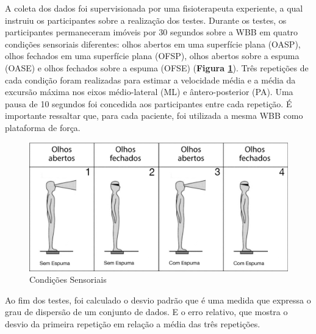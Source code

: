 A coleta dos dados foi supervisionada por uma fisioterapeuta experiente, a qual instruiu os participantes sobre a realização dos testes. Durante os testes, os participantes permaneceram imóveis por 30 segundos sobre a WBB em quatro condições sensoriais diferentes: olhos abertos em uma superfície plana (OASP), olhos fechados em uma superfície plana (OFSP), olhos abertos sobre a espuma (OASE) e olhos fechados sobre a espuma (OFSE) (\textbf{Figura \ref{mctsib}}). Três repetições de cada condição foram realizadas para estimar a velocidade média e a média da excursão máxima nos eixos médio-lateral (ML) e ântero-posterior (PA). Uma pausa de 10 segundos foi concedida aos participantes entre cada repetição. É importante ressaltar que, para cada paciente, foi utilizada a mesma WBB como plataforma de força.

\begin{figure}[ht]
\captionsetup{justification   = raggedright,
              singlelinecheck = false}
\caption{Condições Sensoriais}\label{mctsib}
\includegraphics[width=1.0\textwidth]{mctsib.png}
\end{figure}


Ao fim dos testes, foi calculado o desvio padrão que é uma medida que  expressa o grau de dispersão de um conjunto de dados. E o erro relativo, que mostra o desvio da primeira repetição em relação a média das três repetições.